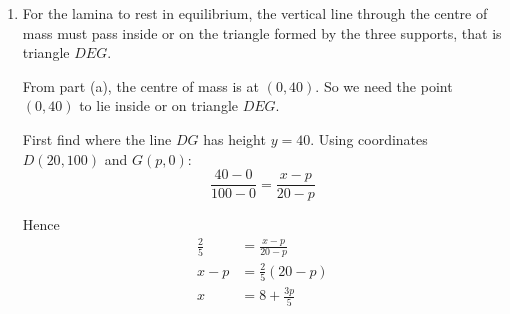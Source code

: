 \documentclass[leqno]{article}
\begin{document}
\begin{enumerate}[
  label=\textbf{\arabic*.},
  leftmargin=*,
  topsep=0pt,
  partopsep=0pt,
  parsep=0pt
]
\begin{djsSolution}
\begin{enumerate}[label=\textbf{(\alph*)}, start=1]
The lamina is uniform, so areas can be used as weights. If piece \(i\) has area \(\mathcal{A}_i\) and the \(y\)-coordinate of its centre of mass is \(y_i\), then
\[
\mathcal{A}\bar{y}=\sum\mathcal{A}_iy_i
\]

where \(\mathcal{A}=\sum\mathcal{A}_i\), with the area of a removed piece counted as negative.

For the rectangle:
\[
\mathcal{A}_1=240\times 100=24\,000,
\qquad y_1=50
\]

For each removed triangle:
\[
\mathcal{A}_2=\frac12\times 100\times 60=3000
\]

The centre of mass of a uniform triangular lamina is \(\frac23\) of the way along a median from the vertex, so it is \(\frac13\) of the perpendicular height from the opposite side.

Each removed triangle has a side along the top edge \(y=100\), and its perpendicular height from that side is \(60\), so
\[
y_2=100-\frac{60}{3}=80
\]

Hence the area of the hexagon is
\[
\mathcal{A}=24\,000-2(3000)=18\,000
\]

Now take moments about the \(x\)-axis:
\[
\mathcal{A}\bar{y}=\mathcal{A}_1y_1-2\mathcal{A}_2y_2
\]

so
\begin{align*}
18\,000\bar{y}
&=24\,000(50)-2(3000)(80)\\
&=1\,200\,000-480\,000\\
&=720\,000
\end{align*}

Therefore
\[
\bar{y}=\frac{720\,000}{18\,000}=40
\]

So the centre of mass is
\[
(\bar{x},\bar{y})=(0,40)
\]

\item For the lamina to rest in equilibrium, the vertical line through the centre of mass must pass inside or on the triangle formed by the three supports, that is triangle \(DEG\).

From part (a), the centre of mass is at \((0,40)\). So we need the point \((0,40)\) to lie inside or on triangle \(DEG\).

First find where the line \(DG\) has height \(y=40\). Using coordinates \(D(20,100)\) and \(G(p,0)\):
\[
\frac{40-0}{100-0}=\frac{x-p}{20-p}
\]

Hence
\begin{align*}
\frac{2}{5}&=\frac{x-p}{20-p}\\
x-p&=\frac{2}{5}(20-p)\\
x&=8+\frac{3p}{5}
\end{align*}


\end{enumerate}
\end{djsSolution}
\end{enumerate}
\end{document}
